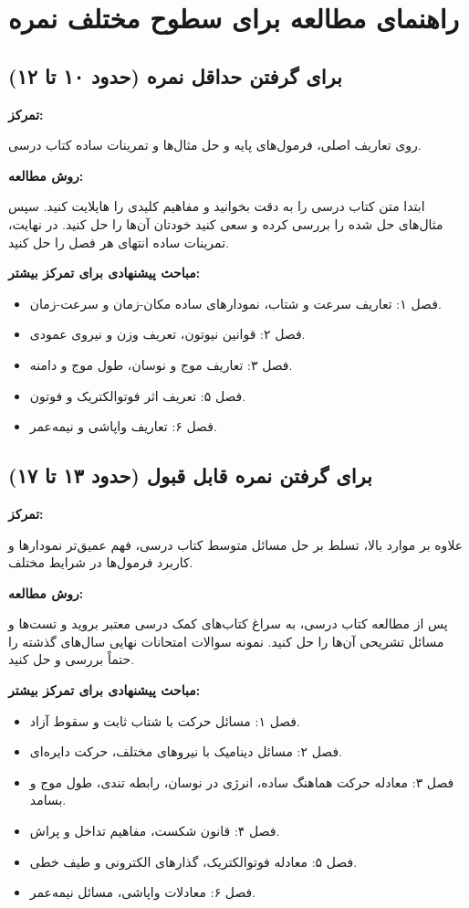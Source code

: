 \documentclass[12pt]{article}
\newcommand{\parahead}[1]{\par\vspace{0.5ex}\noindent\textbf{#1}\par\nopagebreak[4]\vspace{0.5ex}}
\begin{document}
\section{راهنمای مطالعه برای سطوح مختلف نمره}

\subsection{برای گرفتن حداقل نمره (حدود ۱۰ تا ۱۲)}

\parahead{تمرکز:}
روی تعاریف اصلی، فرمول‌های پایه و حل مثال‌ها و تمرینات ساده کتاب درسی.

\parahead{روش مطالعه:}
ابتدا متن کتاب درسی را به دقت بخوانید و مفاهیم کلیدی را هایلایت کنید. سپس مثال‌های حل شده را بررسی کرده و سعی کنید خودتان آن‌ها را حل کنید. در نهایت، تمرینات ساده انتهای هر فصل را حل کنید.

\parahead{مباحث پیشنهادی برای تمرکز بیشتر:}
\begin{itemize}
    \item فصل ۱: تعاریف سرعت و شتاب، نمودارهای ساده مکان-زمان و سرعت-زمان.
    \item فصل ۲: قوانین نیوتون، تعریف وزن و نیروی عمودی.
    \item فصل ۳: تعاریف موج و نوسان، طول موج و دامنه.
    \item فصل ۵: تعریف اثر فوتوالکتریک و فوتون.
    \item فصل ۶: تعاریف واپاشی و نیمه‌عمر.
\end{itemize}

\subsection{برای گرفتن نمره قابل قبول (حدود ۱۳ تا ۱۷)}

\parahead{تمرکز:}
علاوه بر موارد بالا، تسلط بر حل مسائل متوسط کتاب درسی، فهم عمیق‌تر نمودارها و کاربرد فرمول‌ها در شرایط مختلف.

\parahead{روش مطالعه:}
پس از مطالعه کتاب درسی، به سراغ کتاب‌های کمک درسی معتبر بروید و تست‌ها و مسائل تشریحی آن‌ها را حل کنید. نمونه سوالات امتحانات نهایی سال‌های گذشته را حتماً بررسی و حل کنید.

\parahead{مباحث پیشنهادی برای تمرکز بیشتر:}
\begin{itemize}
    \item فصل ۱: مسائل حرکت با شتاب ثابت و سقوط آزاد.
    \item فصل ۲: مسائل دینامیک با نیروهای مختلف، حرکت دایره‌ای.
    \item فصل ۳: معادله حرکت هماهنگ ساده، انرژی در نوسان، رابطه تندی، طول موج و بسامد.
    \item فصل ۴: قانون شکست، مفاهیم تداخل و پراش.
    \item فصل ۵: معادله فوتوالکتریک، گذارهای الکترونی و طیف خطی.
    \item فصل ۶: معادلات واپاشی، مسائل نیمه‌عمر.
\end{itemize}
\end{document}
